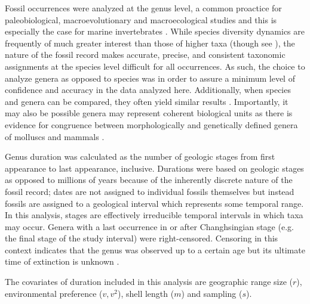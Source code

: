 \documentclass[11pt]{article}
\begin{document}
Fossil occurrences were analyzed at the genus level, a common proactice for paleobiological, macroevolutionary and macroecological studies and this is especially the case for marine invertebrates \citep{Alroy2010,Foote2013,Harnik2013,Kiessling2007a,Miller2009a,Nurnberg2013a,Nurnberg2015,Payne2007,Ritterbush2017,Simpson2009,Vilhena2013,Eronen2011a}. While species diversity dynamics are frequently of much greater interest than those of higher taxa (though see \citealt{Foote2014b,Hoehn2015}), the nature of the fossil record makes accurate, precise, and consistent taxonomic assignments at the species level difficult for all occurrences. As such, the choice to analyze genera as opposed to species was in order to assure a minimum level of confidence and accuracy in the data analyzed here. Additionally, when species and genera can be compared, they often yield similar results \citep{Roy1996,Jernvall2002,Foote2007}. Importantly, it may also be possible genera may represent coherent biological units as there is evidence for congruence between morphologically and genetically defined genera of molluscs and mammals \citep{Jablonski2009}.

Genus duration was calculated as the number of geologic stages from first appearance to last appearance, inclusive. Durations were based on geologic stages as opposed to millions of years because of the inherently discrete nature of the fossil record; dates are not assigned to individual fossils themselves but instead fossils are assigned to a geological interval which represents some temporal range. In this analysis, stages are effectively irreducible temporal intervals in which taxa may occur. Genera with a last occurrence in or after Changhsingian stage (e.g. the final stage of the study interval) were right-censored. Censoring in this context indicates that the genus was observed up to a certain age but its ultimate time of extinction is unknown \citep{Klein2003}.

The covariates of duration included in this analysis are geographic range size (\(r\)), environmental preference (\(v, v^{2}\)), shell length (\(m\)) and sampling (\(s\)).
\end{document}
